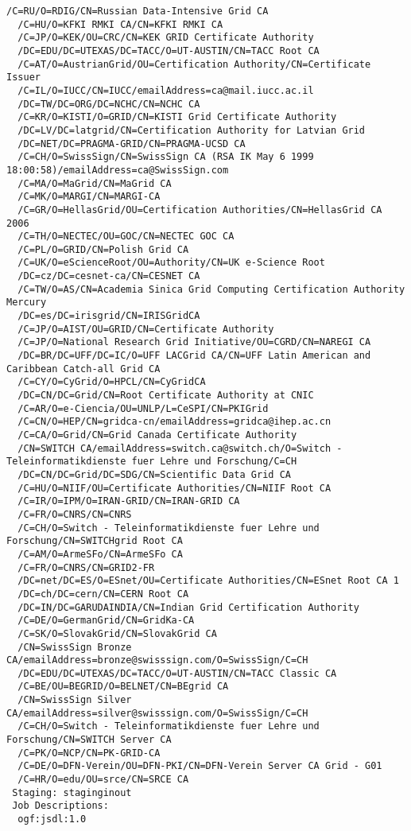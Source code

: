 \documentclass{article}                            %
\begin{document}
\begin{lstlisting}[caption={Example of proper arcinfo output},label=lst:arcinfo]
  /C=RU/O=RDIG/CN=Russian Data-Intensive Grid CA
  /C=HU/O=KFKI RMKI CA/CN=KFKI RMKI CA
  /C=JP/O=KEK/OU=CRC/CN=KEK GRID Certificate Authority
  /DC=EDU/DC=UTEXAS/DC=TACC/O=UT-AUSTIN/CN=TACC Root CA
  /C=AT/O=AustrianGrid/OU=Certification Authority/CN=Certificate Issuer
  /C=IL/O=IUCC/CN=IUCC/emailAddress=ca@mail.iucc.ac.il
  /DC=TW/DC=ORG/DC=NCHC/CN=NCHC CA
  /C=KR/O=KISTI/O=GRID/CN=KISTI Grid Certificate Authority
  /DC=LV/DC=latgrid/CN=Certification Authority for Latvian Grid
  /DC=NET/DC=PRAGMA-GRID/CN=PRAGMA-UCSD CA
  /C=CH/O=SwissSign/CN=SwissSign CA (RSA IK May 6 1999 18:00:58)/emailAddress=ca@SwissSign.com
  /C=MA/O=MaGrid/CN=MaGrid CA
  /C=MK/O=MARGI/CN=MARGI-CA
  /C=GR/O=HellasGrid/OU=Certification Authorities/CN=HellasGrid CA 2006
  /C=TH/O=NECTEC/OU=GOC/CN=NECTEC GOC CA
  /C=PL/O=GRID/CN=Polish Grid CA
  /C=UK/O=eScienceRoot/OU=Authority/CN=UK e-Science Root
  /DC=cz/DC=cesnet-ca/CN=CESNET CA
  /C=TW/O=AS/CN=Academia Sinica Grid Computing Certification Authority Mercury
  /DC=es/DC=irisgrid/CN=IRISGridCA
  /C=JP/O=AIST/OU=GRID/CN=Certificate Authority
  /C=JP/O=National Research Grid Initiative/OU=CGRD/CN=NAREGI CA
  /DC=BR/DC=UFF/DC=IC/O=UFF LACGrid CA/CN=UFF Latin American and Caribbean Catch-all Grid CA
  /C=CY/O=CyGrid/O=HPCL/CN=CyGridCA
  /DC=CN/DC=Grid/CN=Root Certificate Authority at CNIC
  /C=AR/O=e-Ciencia/OU=UNLP/L=CeSPI/CN=PKIGrid
  /C=CN/O=HEP/CN=gridca-cn/emailAddress=gridca@ihep.ac.cn
  /C=CA/O=Grid/CN=Grid Canada Certificate Authority
  /CN=SWITCH CA/emailAddress=switch.ca@switch.ch/O=Switch - Teleinformatikdienste fuer Lehre und Forschung/C=CH
  /DC=CN/DC=Grid/DC=SDG/CN=Scientific Data Grid CA
  /C=HU/O=NIIF/OU=Certificate Authorities/CN=NIIF Root CA
  /C=IR/O=IPM/O=IRAN-GRID/CN=IRAN-GRID CA
  /C=FR/O=CNRS/CN=CNRS
  /C=CH/O=Switch - Teleinformatikdienste fuer Lehre und Forschung/CN=SWITCHgrid Root CA
  /C=AM/O=ArmeSFo/CN=ArmeSFo CA
  /C=FR/O=CNRS/CN=GRID2-FR
  /DC=net/DC=ES/O=ESnet/OU=Certificate Authorities/CN=ESnet Root CA 1
  /DC=ch/DC=cern/CN=CERN Root CA
  /DC=IN/DC=GARUDAINDIA/CN=Indian Grid Certification Authority
  /C=DE/O=GermanGrid/CN=GridKa-CA
  /C=SK/O=SlovakGrid/CN=SlovakGrid CA
  /CN=SwissSign Bronze CA/emailAddress=bronze@swisssign.com/O=SwissSign/C=CH
  /DC=EDU/DC=UTEXAS/DC=TACC/O=UT-AUSTIN/CN=TACC Classic CA
  /C=BE/OU=BEGRID/O=BELNET/CN=BEgrid CA
  /CN=SwissSign Silver CA/emailAddress=silver@swisssign.com/O=SwissSign/C=CH
  /C=CH/O=Switch - Teleinformatikdienste fuer Lehre und Forschung/CN=SWITCH Server CA
  /C=PK/O=NCP/CN=PK-GRID-CA
  /C=DE/O=DFN-Verein/OU=DFN-PKI/CN=DFN-Verein Server CA Grid - G01
  /C=HR/O=edu/OU=srce/CN=SRCE CA
 Staging: staginginout
 Job Descriptions:
  ogf:jsdl:1.0


\end{lstlisting}
\end{document}

